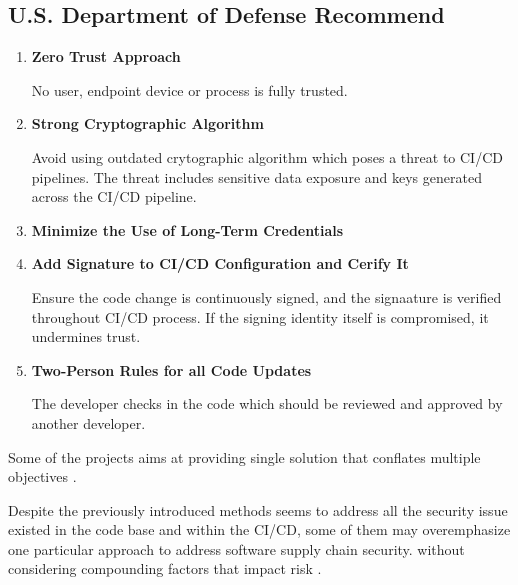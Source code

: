 \subsection{ U.S. Department of Defense Recommend \cite{DoDDefCI/CD2023}}
\begin{enumerate}
    \item \textbf{Zero Trust Approach}
    
        No user, endpoint device or process is fully trusted.

    \item \textbf{Strong Cryptographic Algorithm}
    
        Avoid using outdated crytographic algorithm which poses a threat to CI/CD pipelines.
        The threat includes sensitive data exposure and keys generated across the CI/CD 
        pipeline.

    \item \textbf{Minimize the Use of Long-Term Credentials}

    \item \textbf{Add Signature to CI/CD Configuration and Cerify It}

        Ensure the code change is continuously signed, and the signaature is verified throughout
        CI/CD process. If the signing identity itself is compromised, it undermines trust.
    
    \item \textbf{Two-Person Rules for all Code Updates}

        The developer checks in the code which should be reviewed and approved by another 
        developer. 

\end{enumerate}
Some of the projects aims at providing single solution that conﬂates multiple objectives 
\cite{melara2022software}.

Despite the previously introduced methods seems to address all the security issue
existed in the code base and within the CI/CD, some of them may overemphasize one 
particular approach to address software supply chain security. without considering 
compounding factors that impact risk \cite{melara2022software}.